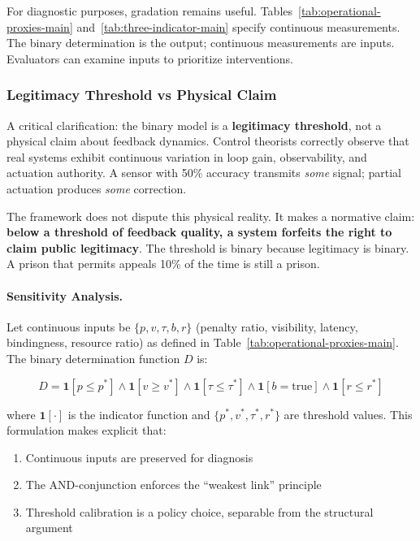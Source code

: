 \documentclass{article}
\begin{document}
For diagnostic purposes, gradation remains useful. Tables~\ref{tab:operational-proxies-main} and~\ref{tab:three-indicator-main} specify continuous measurements. The binary determination is the output; continuous measurements are inputs. Evaluators can examine inputs to prioritize interventions.

\subsubsection{Legitimacy Threshold vs Physical Claim}

A critical clarification: the binary model is a \textbf{legitimacy threshold}, not a physical claim about feedback dynamics. Control theorists correctly observe that real systems exhibit continuous variation in loop gain, observability, and actuation authority. A sensor with 50\% accuracy transmits \textit{some} signal; partial actuation produces \textit{some} correction.

The framework does not dispute this physical reality. It makes a normative claim: \textbf{below a threshold of feedback quality, a system forfeits the right to claim public legitimacy}. The threshold is binary because legitimacy is binary. A prison that permits appeals 10\% of the time is still a prison.

\paragraph{Sensitivity Analysis.} Let continuous inputs be $\{p, v, \tau, b, r\}$ (penalty ratio, visibility, latency, bindingness, resource ratio) as defined in Table~\ref{tab:operational-proxies-main}. The binary determination function $D$ is:

\begin{equation}
D = \mathbf{1}[p \leq p^*] \land \mathbf{1}[v \geq v^*] \land \mathbf{1}[\tau \leq \tau^*] \land \mathbf{1}[b = \text{true}] \land \mathbf{1}[r \leq r^*]
\end{equation}

where $\mathbf{1}[\cdot]$ is the indicator function and $\{p^*, v^*, \tau^*, r^*\}$ are threshold values. This formulation makes explicit that:
\begin{enumerate}[noitemsep]
    \item Continuous inputs are preserved for diagnosis
    \item The AND-conjunction enforces the ``weakest link'' principle
    \item Threshold calibration is a policy choice, separable from the structural argument
\end{enumerate}
\end{document}
